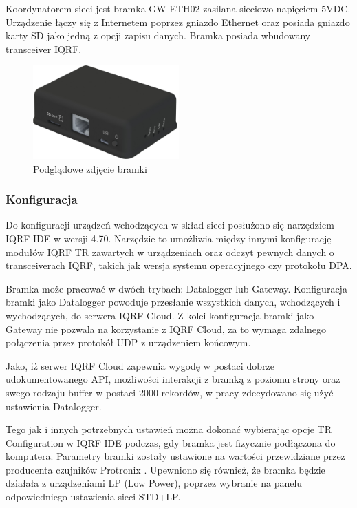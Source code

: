 \documentclass[a4paper, 12pt]{article}
\begin{document}
Koordynatorem sieci jest bramka GW-ETH02 zasilana sieciowo napięciem 5VDC. Urządzenie łączy się z Internetem poprzez gniazdo Ethernet oraz
posiada gniazdo karty SD jako jedną z opcji zapisu danych. Bramka posiada wbudowany transceiver IQRF.

\begin{figure}[H]
    \centering
    \includegraphics[width=0.5\textwidth]{zdj/gateway.png}
    \caption{Podglądowe zdjęcie bramki \cite{gateway-product}}
\end{figure}

\subsubsection{Konfiguracja}

Do konfiguracji urządzeń wchodzących w skład sieci posłużono się narzędziem IQRF IDE w wersji 4.70. Narzędzie to umożliwia między 
innymi konfigurację modułów IQRF TR zawartych w urządzeniach oraz odczyt pewnych danych o transceiverach IQRF, takich jak wersja systemu
operacyjnego czy protokołu DPA.

Bramka może pracować w dwóch trybach: Datalogger lub Gateway. Konfiguracja bramki jako Datalogger powoduje przesłanie wszystkich danych,
wchodzących i wychodzących, do serwera IQRF Cloud. Z kolei konfiguracja bramki jako Gateway nie pozwala na korzystanie z IQRF Cloud, za to wymaga 
zdalnego połączenia przez protokół UDP z urządzeniem końcowym.

Jako, iż serwer IQRF Cloud zapewnia wygodę w postaci dobrze udokumentowanego API, możliwości interakcji z bramką z poziomu strony oraz swego
rodzaju buffer w postaci 2000 rekordów, w pracy zdecydowano się użyć ustawienia Datalogger.

Tego jak i innych potrzebnych ustawień można dokonać wybierając opcje TR Configuration w IQRF IDE podczas, gdy bramka jest fizycznie podłączona
do komputera. Parametry bramki zostały ustawione na wartości przewidziane przez producenta czujników Protronix \cite{protronix-comms}. Upewniono 
się również, że bramka będzie działała z urządzeniami LP (Low Power), poprzez wybranie na panelu odpowiedniego ustawienia sieci STD+LP.
\end{document}
